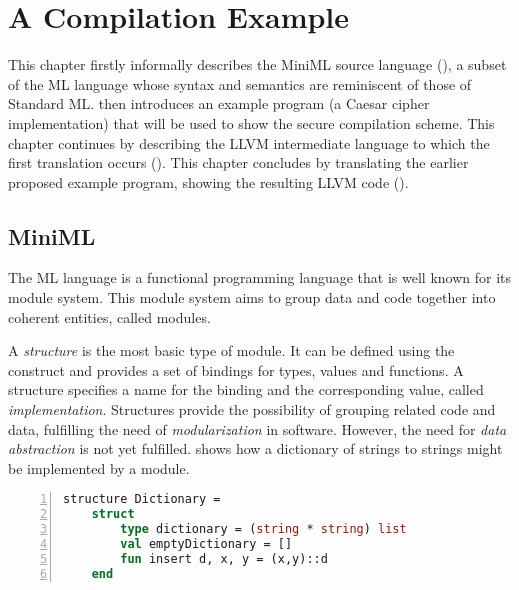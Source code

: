 \chapter{A Compilation Example}
\label{chap:ACompilationExample}
This chapter firstly informally describes the \mbox{MiniML} source language (), a subset of the ML language whose syntax and semantics are reminiscent of those of Standard ML.
 then introduces an example program (a Caesar cipher implementation) that will be used to show the secure compilation scheme.
This chapter continues by describing the LLVM intermediate language to which the first translation occurs ().
This chapter concludes by translating the earlier proposed example program, showing the resulting LLVM code ().

\section{MiniML}
\label{sec:MiniML}
The ML language is a functional programming language that is well known for its module system.
This module system aims to group data and code together into coherent entities, called modules.

A \emph{structure} is the most basic type of module.
It can be defined using the  construct and provides a set of bindings for types, values and functions.
A structure specifies a name for the binding and the corresponding value, called \emph{implementation}.
Structures provide the possibility of grouping related code and data, fulfilling the need of \emph{modularization} in software.
However, the need for \emph{data abstraction} is not yet fulfilled.
 shows how a dictionary of strings to strings might be implemented by a module.
~
\begin{lstlisting}[frame=single, language=ML,caption={[Dictionary Definition Example]An example structure showing the definition of a dictionary in ML.}, label=code:DictionaryStructureExample,numbers=left]
structure Dictionary =
    struct
        type dictionary = (string * string) list
        val emptyDictionary = []
        fun insert d, x, y = (x,y)::d
    end
\end{lstlisting}

